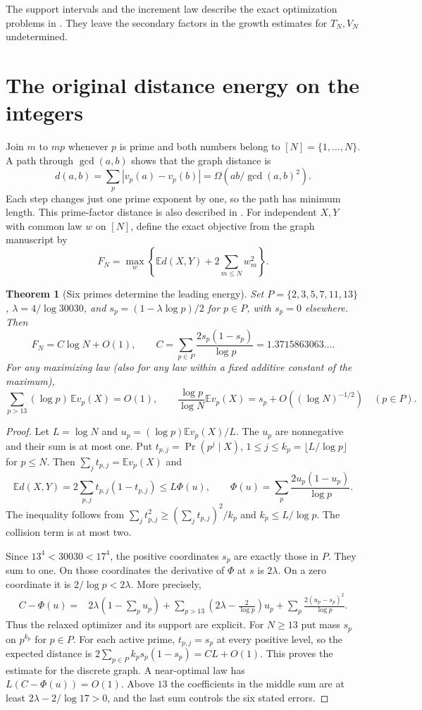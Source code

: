 \documentclass[11pt,a4paper]{article}
\newtheorem{theorem}{Theorem}[section]
\newcommand{\E}{\mathbb{E}}
\begin{document}
The support intervals and the increment law describe the exact optimization problems in \cite{dmtgal}. They leave the secondary factors in the growth estimates for $T_N,V_N$ undetermined.

\section{The original distance energy on the integers}\label{sec:metric}
Join $m$ to $mp$ whenever $p$ is prime and both numbers belong to $[N]=\{1,\ldots,N\}$. A path through $\gcd(a,b)$ shows that the graph distance is
\[
 d(a,b)=\sum_p|v_p(a)-v_p(b)|=\Omega(ab/\gcd(a,b)^2).
\]
Each step changes just one prime exponent by one, so the path has minimum length. This prime-factor distance is also described in \cite{dist}. For independent $X,Y$ with common law $w$ on $[N]$, define the exact objective from the graph manuscript by
\[
 F_N=\max_w\left\{\E d(X,Y)+2\sum_{m\le N}w_m^2\right\}.
\]
\begin{theorem}[Six primes determine the leading energy]
Set $P=\{2,3,5,7,11,13\}$, $\lambda=4/\log 30030$, and $s_p=(1-\lambda\log p)/2$ for $p\in P$, with $s_p=0$ elsewhere. Then
\[
 F_N=C\log N+O(1),\qquad C=\sum_{p\in P}\frac{2s_p(1-s_p)}{\log p}=1.3715863063\ldots .
\]
For any maximizing law (also for any law within a fixed additive constant of the maximum),
\[
 \sum_{p>13}(\log p)\,\E v_p(X)=O(1),\qquad
 \frac{\log p}{\log N}\E v_p(X)=s_p+O((\log N)^{-1/2})\quad (p\in P).
\]
\end{theorem}
\begin{proof}
Let $L=\log N$ and $u_p=(\log p)\E v_p(X)/L$. The $u_p$ are nonnegative and their sum is at most one. Put $t_{p,j}=\Pr(p^j\mid X)$, $1\le j\le k_p=\lfloor L/\log p\rfloor$ for $p\le N$. Then $\sum_j t_{p,j}=\E v_p(X)$ and
\[
 \E d(X,Y)=2\sum_{p,j}t_{p,j}(1-t_{p,j})
 \le L\Phi(u),\qquad
 \Phi(u)=\sum_p\frac{2u_p(1-u_p)}{\log p}.
\]
The inequality follows from $\sum_j t_{p,j}^2\ge(\sum_jt_{p,j})^2/k_p$ and $k_p\le L/\log p$. The collision term is at most two.
 
Since $13^4<30030<17^4$, the positive coordinates $s_p$ are exactly those in $P$. They sum to one. On those coordinates the derivative of $\Phi$ at $s$ is $2\lambda$. On a zero coordinate it is $2/\log p<2\lambda$. More precisely,
\begin{align*}
 C-\Phi(u)={}&2\lambda\left(1-\sum_p u_p\right)
 +\sum_{p>13}\left(2\lambda-\frac{2}{\log p}\right)u_p
 +\sum_p\frac{2(u_p-s_p)^2}{\log p}.
\end{align*}
Thus the relaxed optimizer and its support are explicit. For $N\ge13$ put mass $s_p$ on $p^{k_p}$ for $p\in P$. For each active prime, $t_{p,j}=s_p$ at every positive level, so the expected distance is $2\sum_{p\in P}k_p s_p(1-s_p)=CL+O(1)$. This proves the estimate for the discrete graph. A near-optimal law has $L(C-\Phi(u))=O(1)$. Above $13$ the coefficients in the middle sum are at least $2\lambda-2/\log17>0$, and the last sum controls the six stated errors.
\end{proof}
\end{document}
